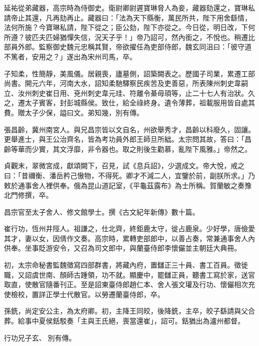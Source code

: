 \begin{pinyinscope}
 延祐從弟藏器，高宗時為侍御史。衛尉卿尉遲寶琳脅人為妾，藏器劾還之，寶琳私請帝止其還，凡再劾再止。藏器曰：「法為天下縣衡，萬民所共，陛下用舍繇情，法何所施？今寶琳私請，陛下從之；臣公劾，陛下亦從之。今日從，明日改，下何所遵？彼匹夫匹婦猶憚失信，況天子乎！」帝乃詔可，然內銜之，不悅也。稍遷比部員外郎。監察御史魏元忠稱其賢，帝欲擢任為吏部侍郎，魏玄同沮曰：「彼守道不篤者，安用之？」遂出為宋州司馬，卒。



 子知柔，性簡靜，美風儀。居親喪，廬墓側，詔築闕表之。歷國子司業，累遷工部尚書。開元六年，河南大水，詔知柔馳驛察民疾苦及吏善惡，所表陳州刺史韋嗣立、汝州刺史崔日用、兗州刺史韋元珪、符離令綦毋頊等，止二十七人有治狀。久之，遷太子賓客，封彭城縣侯。致仕，給全祿終身。遺令薄葬，祖載服用皆自處其費。贈太子少保，謚曰文。弟知幾，別有傳。



 張昌齡，冀州南宮人。與兄昌宗皆以文自名，州欲舉秀才，昌齡以科廢久，固讓。更舉進士，與王公治齊名，皆為考功員外郎王師旦所絀。太宗問其故，答曰：「昌齡等華而少實，其文浮靡，非令器也。取之則後生勸慕，亂陛下風雅。」帝然之。



 貞觀末，翠微宮成，獻頌闕下，召見，試《息兵詔》，少選成文。帝大悅，戒之曰：「昔禰衡、潘岳矜己慠物，不得死。卿才不減二人，宜鑒於前，副朕所求。」乃敕於通事舍人裡供奉。俄為昆山道記室，《平龜茲露布》為士所稱。賀蘭敏之奏豫北門修撰，卒。



 昌宗官至太子舍人、修文館學士。撰《古文紀年新傳》數十篇。



 崔行功，恆州井陘人。祖謙之，仕北齊，終鉅鹿太守，徙占鹿泉。少好學，唐儉愛其才，妻以女，因倩作文奏。高宗時，累轉吏部郎中，以善占奏，常兼通事舍人內供奉。坐事貶游安令，又召為司文郎中，與蘭臺侍郎李懷儼並主朝廷大典冊。



 初，太宗命秘書監魏徵寫四部群書，將藏內府，置讎正三十員、書工百員。徵徙職，又詔虞世南、顏師古踵領，功不就。顯慶中，罷讎正員，聽書工寫於家，送官取直，使散官隨番刊正。至是詔東臺侍郎趙仁本、舍人張文瓘及行功、懷儼相次充使檢校，置詳正學士代散官。以勞遷蘭臺侍郎，卒。



 孫銑，尚定安公主，為太府卿。初，主降王同皎，後降銑，主卒，皎子繇請與父合葬。給事中夏侯銛駁奏「主與王氏絕，喪當還崔」，詔可。銛猶出為瀘州都督。



 行功兄子玄、別有傳。




\end{pinyinscope}
